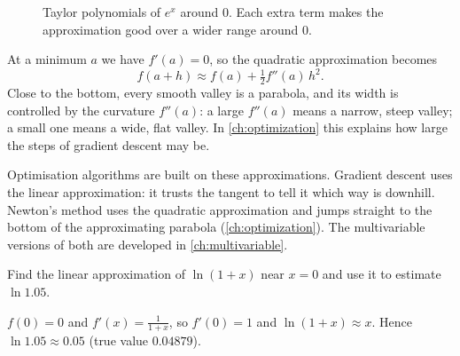 \begin{figure}[htbp]
\centering
{}
\caption{Taylor polynomials of $e^x$ around $0$. Each extra term makes the
  approximation good over a wider range around $0$.}
\label{fig:taylor}
\end{figure}

\begin{intuition}
At a minimum $a$ we have $f'(a) = 0$, so the quadratic approximation becomes
\[
  f(a + h) \approx f(a) + \tfrac12 f''(a)\,h^2 .
\]
Close to the bottom, every smooth valley is a parabola, and its width is
controlled by the curvature $f''(a)$: a large $f''(a)$ means a narrow, steep
valley; a small one means a wide, flat valley. In \cref{ch:optimization} this
explains how large the steps of gradient descent may be.
\end{intuition}

\begin{mlnote}
Optimisation algorithms are built on these approximations. Gradient descent
uses the linear approximation: it trusts the tangent to tell it which way is
downhill. Newton's method uses the quadratic approximation and jumps straight
to the bottom of the approximating parabola (\cref{ch:optimization}). The
multivariable versions of both are developed in \cref{ch:multivariable}.
\end{mlnote}

\sectionexercises

\begin{exercise}
Find the linear approximation of $\ln(1 + x)$ near $x = 0$ and use it to
estimate $\ln 1.05$.
\end{exercise}
\begin{solution}
$f(0) = 0$ and $f'(x) = \tfrac{1}{1+x}$, so $f'(0) = 1$ and
$\ln(1 + x) \approx x$. Hence $\ln1.05 \approx 0.05$ (true value $0.04879$).
\end{solution}

